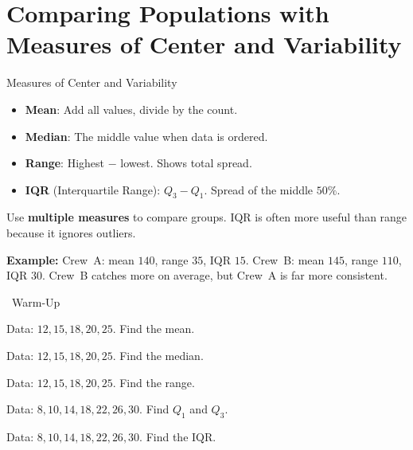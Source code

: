 \section{Comparing Populations with Measures of Center and Variability}

\begin{quickReview}{Measures of Center and Variability}
\begin{itemize}[leftmargin=*]
    \item \textbf{Mean}: Add all values, divide by the count.
    \item \textbf{Median}: The middle value when data is ordered.
    \item \textbf{Range}: Highest $-$ lowest. Shows total spread.
    \item \textbf{IQR} (Interquartile Range): $Q_3 - Q_1$. Spread of the middle $50\%$.
\end{itemize}

Use \textbf{multiple measures} to compare groups. IQR is often more useful than range because it ignores outliers.

\medskip
\textbf{Example:} Crew~A: mean $140$, range $35$, IQR $15$. Crew~B: mean $145$, range $110$, IQR $30$. Crew~B catches more on average, but Crew~A is far more consistent.
\end{quickReview}

\begin{practiceBox}[funGreen]{\faSun~Warm-Up}


\prob Data: $12, 15, 18, 20, 25$. Find the mean. \answerBlank[3cm]

\prob Data: $12, 15, 18, 20, 25$. Find the median. \answerBlank[3cm]

\prob Data: $12, 15, 18, 20, 25$. Find the range. \answerBlank[3cm]

\prob Data: $8, 10, 14, 18, 22, 26, 30$. Find $Q_1$ and $Q_3$. \answerBlank[3cm]

\prob Data: $8, 10, 14, 18, 22, 26, 30$. Find the IQR. \answerBlank[3cm]

\end{practiceBox}


